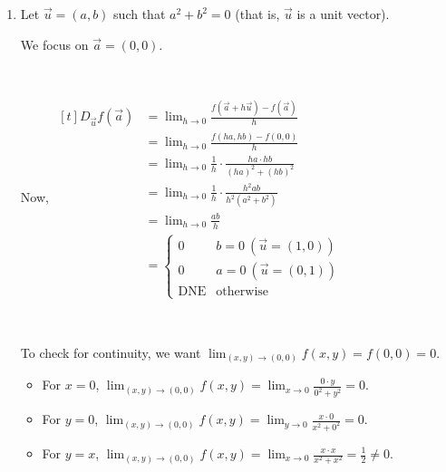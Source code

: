 \documentclass[11pt,fleqn]{book} %
\begin{document}
\begin{enumerate}[label=\alph*)]
    \item Let $\vec{u} = (a,b)$ such that $a^2 + b^2 = 0$ (that is, $\vec{u}$ is a unit vector). 
    
    We focus on $\vec{a} = (0,0)$. 

    {~~~}

    Now, $\begin{aligned}[t]
        D_{\vec{u}} f(\vec{a}) & = \lim_{h\to0} \frac{f(\vec{a} + h\vec{u}) - f(\vec{a})}{h}          \\
                               & = \lim_{h\to0} \frac{f(ha,hb) - f(0,0)}{h}                           \\
                               & = \lim_{h\to0} \frac{1}{h} \cdot \frac{ha \cdot hb}{(ha)^2 + (hb)^2} \\
                               & = \lim_{h\to0} \frac{1}{h} \cdot \frac{h^2ab}{h^2(a^2 + b^2)}        \\
                               & = \lim_{h\to0} \frac{ab}{h}                                          \\
                               & = \begin{cases}
                                        0          & b = 0 ~ (\vec{u} = (1,0))\\
                                        0          & a = 0 ~ (\vec{u} = (0,1))\\
                                        \text{DNE} & \text{otherwise}
                                   \end{cases}
    \end{aligned}$

    {~~~}

    To check for continuity, we want $\lim_{(x,y)\to(0,0)} f(x,y) = f(0,0) = 0$. 

    \begin{itemize}
        \item For $x = 0$, $\lim_{(x,y)\to(0,0)} f(x,y) = \lim_{x\to0} \frac{0 \cdot y}{0^2 + y^2} = 0$.
        \item For $y = 0$, $\lim_{(x,y)\to(0,0)} f(x,y) = \lim_{y\to0} \frac{x \cdot 0}{x^2 + 0^2} = 0$.
        \item For $y = x$, $\lim_{(x,y)\to(0,0)} f(x,y) = \lim_{x\to0} \frac{x \cdot x}{x^2 + x^2} = \frac{1}{2} \neq 0$. 
    \end{itemize}

    {~~~}
    

\end{enumerate}
\end{document}
